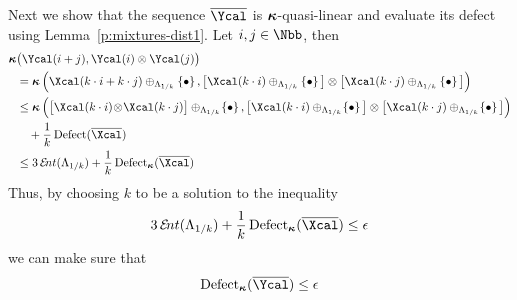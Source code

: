 \begin{Proof}
  Next we show that the sequence $\bar\Ycal$ is $\operatorname{{\bm\kappa}}$-quasi-linear and evaluate
  its defect using Lemma~\ref{p:mixtures-dist1}. Let $i,j\in\Nbb$, then
  \begin{align*}
    \aikd&\big(\Ycal(i+j),\Ycal(i)\otimes\Ycal(j)\big)
    \\
    &=
    \aikd\Big(\Xcal(k\cdot i+k\cdot j)
                \oplus_{\Lambda_{1/k}}\set{\bullet},
              \big[
                \Xcal(k\cdot i)
                \oplus_{\Lambda_{1/k}}\set{\bullet}
              \big]
              \otimes
              \big[
                \Xcal(k\cdot j)
                \oplus_{\Lambda_{1/k}}\set{\bullet}
              \big]
         \Big)    
    \\
    &\leq
    \aikd\Big(\big[\Xcal(k\cdot i)\!\otimes\!\Xcal(k\cdot j)\big]
                   \oplus_{\Lambda_{1/k}}\!\set{\bullet},     
              \big[
                \Xcal(k\cdot i)
                \oplus_{\Lambda_{1/k}}\!\set{\bullet}
              \big]
              \otimes
              \big[
                \Xcal(k\cdot j)
                \oplus_{\Lambda_{1/k}}\!\set{\bullet}
              \big]
         \Big)    
     \\
     &\quad+
     \frac1k \defect(\bar\Xcal)
     \\
     &\leq
     3\ent(\Lambda_{1/k})+\frac1k \defect_{\aikd}(\bar\Xcal)
  \end{align*}
  Thus, by choosing $k$ to be a solution to the inequality
  \[
  3\ent(\Lambda_{1/k})+\frac1k \defect_{\aikd}(\bar\Xcal)\leq\epsilon
  \]
  we can make sure that 
  \[
  \defect_{\aikd}(\bar\Ycal)\leq\epsilon
  \]
\end{Proof}





